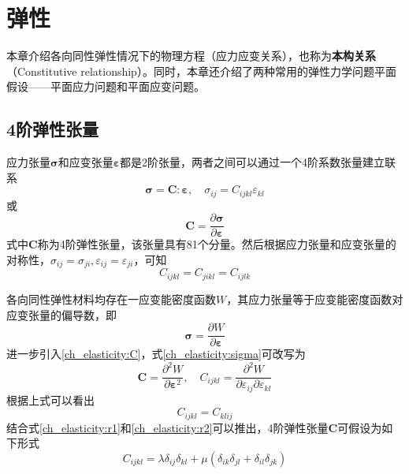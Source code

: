 \chapter{弹性}
本章介绍各向同性弹性情况下的物理方程（应力应变关系），也称为\textbf{本构关系}（Constitutive relationship）。同时，本章还介绍了两种常用的弹性力学问题平面假设——平面应力问题和平面应变问题。
\section{4阶弹性张量}
应力张量$\boldsymbol \sigma$和应变张量$\boldsymbol \varepsilon$都是2阶张量，两者之间可以通过一个4阶系数张量建立联系
\begin{equation}\label{ch_elasticity:stress}
\boldsymbol \sigma = \boldsymbol C : \boldsymbol \varepsilon, \quad \sigma_{ij} = C_{ijkl} \varepsilon_{kl}
\end{equation}
或
\begin{equation}\label{ch_elasticity:C}
\boldsymbol C = \frac{\partial \boldsymbol \sigma}{\partial \boldsymbol \varepsilon}
\end{equation}
式中$\boldsymbol C$称为4阶弹性张量，该张量具有81个分量。然后根据应力张量和应变张量的对称性，$\sigma_{ij} = \sigma_{ji}, \varepsilon_{ij} = \varepsilon_{ji}$，可知
\begin{equation}\label{ch_elasticity:r1}
C_{ijkl} = C_{jikl} = C_{ijlk}
\end{equation}\par
各向同性弹性材料均存在一应变能密度函数$W$，其应力张量等于应变能密度函数对应变张量的偏导数，即
\begin{equation}\label{ch_elasticity:sigma}
\boldsymbol \sigma = \frac{\partial W}{\partial \boldsymbol \varepsilon}
\end{equation}
进一步引入\eqref{ch_elasticity:C}，式\eqref{ch_elasticity:sigma}可改写为
\begin{equation}
\boldsymbol C = \frac{\partial^2 W}{\partial \boldsymbol \varepsilon^2}, \quad C_{ijkl} = \frac{\partial^2 W}{\partial \varepsilon_{ij} \partial \varepsilon_{kl}}
\end{equation}
根据上式可以看出
\begin{equation}\label{ch_elasticity:r2}
C_{ijkl} = C_{klij}
\end{equation}
结合式\eqref{ch_elasticity:r1}和\eqref{ch_elasticity:r2}可以推出，4阶弹性张量$\boldsymbol C$可假设为如下形式
\begin{equation}\label{ch_elasticity:Cijkl}
C_{ijkl} = \lambda \delta_{ij} \delta_{kl} + \mu (\delta_{ik}\delta_{jl} + \delta_{il}\delta_{jk})
\end{equation}
